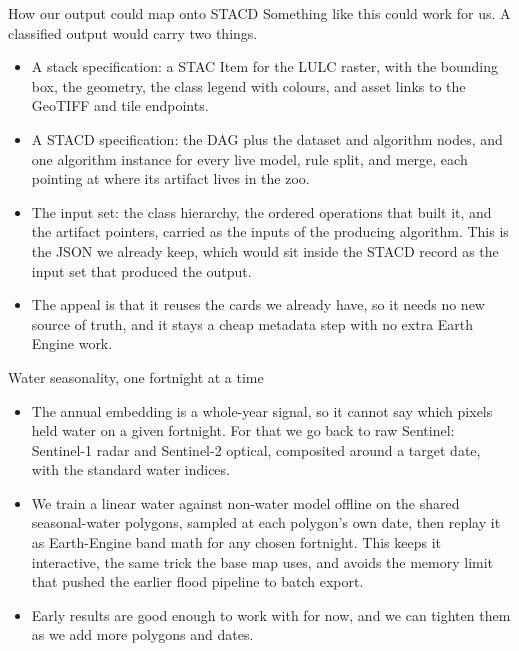 \documentclass[aspectratio=169]{beamer}
\begin{document}
\begin{frame}{How our output could map onto STACD}
Something like this could work for us. A classified output would carry two things.
\begin{itemize}\small
  \item A stack specification: a STAC Item for the LULC raster, with the bounding box, the geometry,
  the class legend with colours, and asset links to the GeoTIFF and tile endpoints.
  \item A STACD specification: the DAG plus the dataset and algorithm nodes, and one algorithm
  instance for every live model, rule split, and merge, each pointing at where its artifact lives in
  the zoo.
  \item The input set: the class hierarchy, the ordered operations that built it, and the artifact
  pointers, carried as the inputs of the producing algorithm. This is the JSON we already keep, which
  would sit inside the STACD record as the input set that produced the output.
  \item The appeal is that it reuses the cards we already have, so it needs no new source of truth,
  and it stays a cheap metadata step with no extra Earth Engine work.
\end{itemize}
\end{frame}

\begin{frame}{Water seasonality, one fortnight at a time}
\begin{itemize}\small
  \item The annual embedding is a whole-year signal, so it cannot say which pixels held water on a
  given fortnight. For that we go back to raw Sentinel: Sentinel-1 radar and Sentinel-2 optical,
  composited around a target date, with the standard water indices.
  \item We train a linear water against non-water model offline on the shared seasonal-water
  polygons, sampled at each polygon's own date, then replay it as Earth-Engine band math for any
  chosen fortnight. This keeps it interactive, the same trick the base map uses, and avoids the
  memory limit that pushed the earlier flood pipeline to batch export.
  \item Early results are good enough to work with for now, and we can tighten them as we add more
  polygons and dates.
\end{itemize}
\end{frame}
\end{document}
